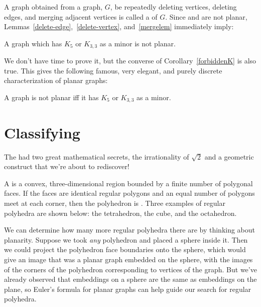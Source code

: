 A graph obtained from a graph, $G$, be repeatedly deleting vertices,
deleting edges, and merging adjacent vertices is called a  of
$G$.  Since  and  are not planar,
Lemmas~\ref{delete-edge},~\ref{delete-vertex}, and~\ref{mergelem}
immediately imply:

\begin{corollary}\label{forbiddenK}
  A graph which has $K_5$ or $K_{3,3}$ as a minor is not planar.
\end{corollary}

We don't have time to prove it, but the converse of
Corollary~\ref{forbiddenK} is also true.  This gives the following famous,
very elegant, and purely discrete characterization of planar graphs:

\begin{theorem}
  A graph is not planar iff it has $K_5$ or $K_{3,3}$ as a minor.
\end{theorem}

\section{Classifying }

The  had two great mathematical secrets, the
irrationality of $\sqrt{2}$ and a geometric construct that we're about to
rediscover!

A  is a convex, three-dimensional region bounded by a
finite number of polygonal faces.  If the faces are identical regular
polygons and an equal number of polygons meet at each corner, then the
polyhedron is .  Three examples
of regular polyhedra are shown below: the tetrahedron, the cube, and the
octahedron.

We can determine how many more regular polyhedra there are by thinking
about planarity.  Suppose we took \emph{any} polyhedron and placed a
sphere inside it.  Then we could project the polyhedron face boundaries
onto the sphere, which would give an image that was a planar graph
embedded on the sphere, with the images of the corners of the polyhedron
corresponding to vertices of the graph.  But we've already observed that
embeddings on a sphere are the same as embeddings on the plane, so Euler's
formula for planar graphs can help guide our search for regular polyhedra.

